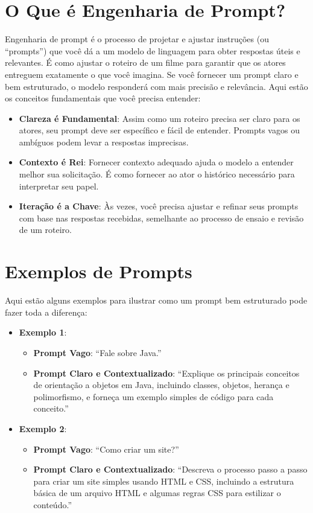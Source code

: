 \documentclass[a4paper,12pt]{book}
\begin{document}
\section{O Que é Engenharia de Prompt?}

Engenharia de prompt é o processo de projetar e ajustar instruções (ou ``prompts'') que você dá a um modelo de linguagem para obter respostas úteis e relevantes. É como ajustar o roteiro de um filme para garantir que os atores entreguem exatamente o que você imagina. Se você fornecer um prompt claro e bem estruturado, o modelo responderá com mais precisão e relevância. Aqui estão os conceitos fundamentais que você precisa entender:

\begin{itemize}
    \item \textbf{Clareza é Fundamental}: Assim como um roteiro precisa ser claro para os atores, seu prompt deve ser específico e fácil de entender. Prompts vagos ou ambíguos podem levar a respostas imprecisas.
    \item \textbf{Contexto é Rei}: Fornecer contexto adequado ajuda o modelo a entender melhor sua solicitação. É como fornecer ao ator o histórico necessário para interpretar seu papel.
    \item \textbf{Iteração é a Chave}: Às vezes, você precisa ajustar e refinar seus prompts com base nas respostas recebidas, semelhante ao processo de ensaio e revisão de um roteiro.
\end{itemize}

\section{Exemplos de Prompts}

Aqui estão alguns exemplos para ilustrar como um prompt bem estruturado pode fazer toda a diferença:

\begin{itemize}
    \item \textbf{Exemplo 1}:
    \begin{itemize}
        \item \textbf{Prompt Vago}: ``Fale sobre Java.''
        \item \textbf{Prompt Claro e Contextualizado}: ``Explique os principais conceitos de orientação a objetos em Java, incluindo classes, objetos, herança e polimorfismo, e forneça um exemplo simples de código para cada conceito.''
    \end{itemize}
    
    \item \textbf{Exemplo 2}:
    \begin{itemize}
        \item \textbf{Prompt Vago}: ``Como criar um site?''
        \item \textbf{Prompt Claro e Contextualizado}: ``Descreva o processo passo a passo para criar um site simples usando HTML e CSS, incluindo a estrutura básica de um arquivo HTML e algumas regras CSS para estilizar o conteúdo.''
    \end{itemize}
\end{itemize}
\end{document}

